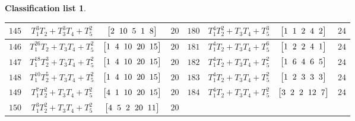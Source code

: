 \documentclass[pdftex]{sigma}%
\theoremstyle{definition}
\newtheorem{class-list}[thm]{Classification list}
\numberwithin{equation}{section}
\begin{document}
\begin{class-list}
\begin{table}[t!]
\begin{tabu}{c|c|c|c||c|c|c|c}
\hline
${145}$&${T_{1}^{3}T_{2}+T_{3}^{3}T_{4}+T_{5}^{2}}$
&$\arraycolsep=1mm\begin{bmatrix}{2} & {10} & {5} & {1} & {8}\end{bmatrix}$&${20}$
&${180}$&${T_{1}^{4}T_{2}^{2}+T_{3}T_{4}+T_{5}^{3}}$
&$\arraycolsep=1mm\begin{bmatrix}{1} & {1} & {2} & {4} & {2}\end{bmatrix}$&${24}$
\\
\hline
${146}$&${T_{1}^{26}T_{2}+T_{3}T_{4}+T_{5}^{2}}$
&$\arraycolsep=1mm\begin{bmatrix}{1} & {4} & {10} & {20} & {15}\end{bmatrix}$&${20}$
&${181}$&${T_{1}^{4}T_{2}+T_{3}T_{4}+T_{5}^{6}}$
&$\arraycolsep=1mm\begin{bmatrix}{1} & {2} & {2} & {4} & {1}\end{bmatrix}$&${24}$
\\
\hline
${147}$&${T_{1}^{18}T_{2}^{3}+T_{3}T_{4}+T_{5}^{2}}$
&$\arraycolsep=1mm\begin{bmatrix}{1} & {4} & {10} & {20} & {15}\end{bmatrix}$&${20}$
&${182}$&${T_{1}^{4}T_{2}+T_{3}T_{4}+T_{5}^{2}}$
&$\arraycolsep=1mm\begin{bmatrix}{1} & {6} & {4} & {6} & {5}\end{bmatrix}$&${24}$
\\
\hline
${148}$&${T_{1}^{10}T_{2}^{5}+T_{3}T_{4}+T_{5}^{2}}$
&$\arraycolsep=1mm\begin{bmatrix}{1} & {4} & {10} & {20} & {15}\end{bmatrix}$&${20}$
&${183}$&${T_{1}^{4}T_{2}+T_{3}T_{4}+T_{5}^{2}}$
&$\arraycolsep=1mm\begin{bmatrix}{1} & {2} & {3} & {3} & {3}\end{bmatrix}$&${24}$
\\
\hline
${149}$&${T_{1}^{7}T_{2}^{2}+T_{3}T_{4}+T_{5}^{2}}$
&$\arraycolsep=1mm\begin{bmatrix}{4} & {1} & {10} & {20} & {15}\end{bmatrix}$&${20}$
&${184}$&${T_{1}^{4}T_{2}+T_{3}T_{4}+T_{5}^{2}}$
&$\arraycolsep=1mm\begin{bmatrix}{3} & {2} & {2} & {12} & {7}\end{bmatrix}$&${24}$
\\
\hline
${150}$&${T_{1}^{3}T_{2}^{2}+T_{3}T_{4}+T_{5}^{2}}$
&$\arraycolsep=1mm\begin{bmatrix}{4} & {5} & {2} & {20} & {11}\end{bmatrix}$&${20}$

\end{tabu}
\end{table}
\end{class-list}
\end{document}
